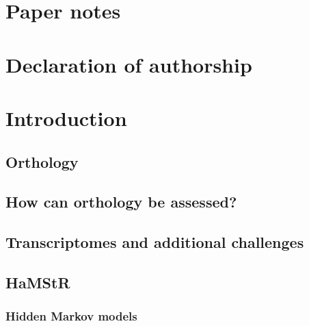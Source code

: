 \documentclass[a4paper,12pt]{scrreprt}
\newcommand{\hamstr}{HaMStR\xspace}
\begin{document}
\begin{titlepage}
	
\end{titlepage}

\pagestyle{empty}
\chapter*{Paper notes}
	

\chapter*{Declaration of authorship}
	
	\clearpage

\pagestyle{headings}

\tableofcontents
\clearpage

{}
\listoffigures
\clearpage

{}
\listoftables
\clearpage




\chapter{Introduction}
	
	\section{Orthology}
		
	\section{How can orthology be assessed?}
		
	\section{Transcriptomes and additional challenges}
		
	\section{\hamstr}
		
		\subsection{Hidden Markov models}
			
\end{document}
